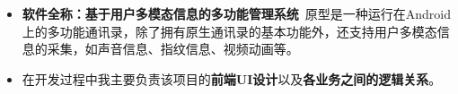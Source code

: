\documentclass[10pt,a4paper]{altacv}
\begin{document}
\begin{itemize}
	\item \textbf{软件全称：基于用户多模态信息的多功能管理系统}\  原型是一种运行在Android上的多功能通讯录，除了拥有原生通讯录的基本功能外，还支持用户多模态信息的采集，如声音信息、指纹信息、视频动画等。
	\item  在开发过程中我主要负责该项目的\textbf{前端UI设计}以及\textbf{各业务之间的逻辑关系}。
\end{itemize}
\end{document}
